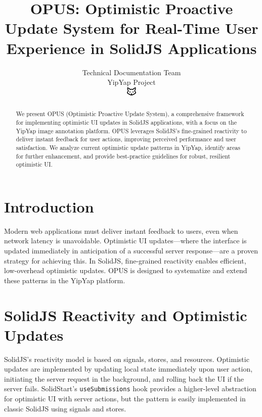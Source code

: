 \documentclass[10pt]{article}
\begin{document}
\title{OPUS: Optimistic Proactive Update System for Real-Time User Experience in SolidJS Applications}

\author{Technical Documentation Team\\YipYap Project\\\includegraphics[width=0.5cm]{../nexus/favicon.pdf}}

\maketitle

\begin{abstract}
We present OPUS (Optimistic Proactive Update System), a comprehensive framework for implementing optimistic UI updates in SolidJS applications, with a focus on the YipYap image annotation platform. OPUS leverages SolidJS's fine-grained reactivity to deliver instant feedback for user actions, improving perceived performance and user satisfaction. We analyze current optimistic update patterns in YipYap, identify areas for further enhancement, and provide best-practice guidelines for robust, resilient optimistic UI.
\end{abstract}

\section{Introduction}
Modern web applications must deliver instant feedback to users, even when network latency is unavoidable. Optimistic UI updates---where the interface is updated immediately in anticipation of a successful server response---are a proven strategy for achieving this. In SolidJS, fine-grained reactivity enables efficient, low-overhead optimistic updates. OPUS is designed to systematize and extend these patterns in the YipYap platform.

\section{SolidJS Reactivity and Optimistic Updates}
SolidJS's reactivity model is based on signals, stores, and resources. Optimistic updates are implemented by updating local state immediately upon user action, initiating the server request in the background, and rolling back the UI if the server fails. SolidStart's \texttt{useSubmissions} hook provides a higher-level abstraction for optimistic UI with server actions, but the pattern is easily implemented in classic SolidJS using signals and stores.
\end{document}
